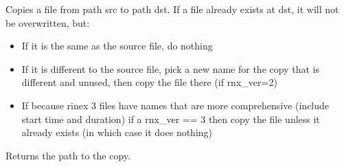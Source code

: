 \documentclass[letterpaper,10pt,english]{sphinxmanual}
\begin{document}

\begin{fulllineitems}
\label{\detokenize{classes:classes.Utils.cart2euler}}
\pysigstartsignatures
{}
\pysigstopsignatures
\end{fulllineitems}


\begin{fulllineitems}
\label{\detokenize{classes:classes.Utils.chmod_exec}}
\pysigstartsignatures
{}
\pysigstopsignatures
\end{fulllineitems}


\begin{fulllineitems}
\label{\detokenize{classes:classes.Utils.copyfile}}
\pysigstartsignatures
{}
\pysigstopsignatures
\sphinxAtStartPar
Copies a file from path src to path dst.
If a file already exists at dst, it will not be overwritten, but:
\begin{itemize}
\item {} 
\sphinxAtStartPar
If it is the same as the source file, do nothing

\item {} 
\sphinxAtStartPar
If it is different to the source file, pick a new name for the copy that
is different and unused, then copy the file there (if rnx\_ver=2)

\item {} 
\sphinxAtStartPar
If because rinex 3 files have names that are more comprehensive (include start time and duration)
if a rnx\_ver == 3 then copy the file unless it already exists (in which case it does nothing)

\end{itemize}

\sphinxAtStartPar
Returns the path to the copy.

\end{fulllineitems}
\end{document}
